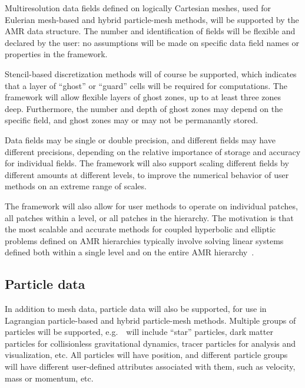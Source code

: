\documentclass[10pt]{article}
\begin{document}
Multiresolution data fields defined on logically Cartesian meshes,
used for Eulerian mesh-based and hybrid particle-mesh methods, will be
supported by the AMR data structure.  The number and identification of
fields will be flexible and declared by the user: no assumptions will
be made on specific data field names or properties in the framework.

Stencil-based discretization methods will of course be supported,
which indicates that a layer of ``ghost'' or ``guard'' cells will be
required for computations.  The framework will allow flexible layers
of ghost zones, up to at least three zones deep.  Furthermore, the
number and depth of ghost zones may depend on the specific field, and
ghost zones may or may not be permanantly stored.

Data fields may be single or double precision, and different fields
may have different precisions, depending on the relative importance of
storage and accuracy for individual fields.  The framework will also
support scaling different fields by different amounts at different
levels, to improve the numerical behavior of user methods on an
extreme range of scales.

The framework will also allow for user methods to operate on
individual patches, all patches within a level, or all patches in the
hierarchy.  The motivation is that the most scalable and accurate
methods for coupled hyperbolic and elliptic problems defined on AMR
hierarchies typically involve solving linear systems defined both
within a single level and on the entire AMR hierarchy~\cite{MiCo07}.


\subsection{Particle data} \label{ss:require-particles}

In addition to mesh data, particle data will also be supported, for
use in Lagrangian particle-based and hybrid particle-mesh methods.
Multiple groups of particles will be supported, e.g.~\enzoii\ will
include ``star'' particles, dark matter particles for collisionless
gravitational dynamics, tracer particles for analysis and
visualization, etc.  All particles will have position, and different particle
groups will have different user-defined attributes associated with them, such
as velocity, mass or momentum, etc.
\end{document}
